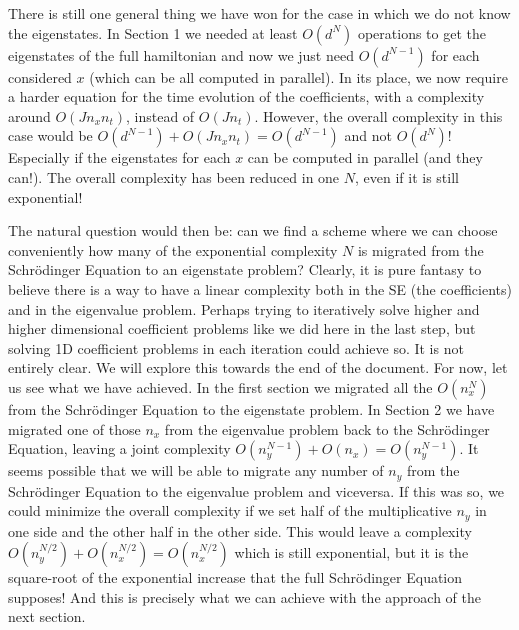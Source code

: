 \documentclass[11pt, a4paper]{article} %
\begin{document}
There is still one general thing we have won for the case in which we do not know the eigenstates. In Section 1 we needed at least $O(d^N)$ operations to get the eigenstates of the full hamiltonian and now we just need $O(d^{N-1})$ for each considered $x$ (which can be all computed in parallel). In its place, we now require a harder equation for the time evolution of the coefficients, with a complexity around $O(Jn_xn_t)$, instead of $O(Jn_t)$. However, the overall complexity in this case would be $O(d^{N-1})+O(Jn_xn_t)=O(d^{N-1})$ and not $O(d^N)$! Especially if the eigenstates for each $x$ can be computed in parallel (and they can!). The overall complexity has been reduced in one $N$, even if it is still exponential!

The natural question would then be: can we find a scheme where we can choose conveniently how many of the exponential complexity $N$ is migrated from the Schrödinger Equation to an eigenstate problem? Clearly, it is pure fantasy to believe there is a way to have a linear complexity both in the SE (the coefficients) and in the eigenvalue problem. Perhaps trying to iteratively solve higher and higher dimensional coefficient problems like we did here in the last step, but solving 1D coefficient problems in each iteration could achieve so. It is not entirely clear. We will explore this towards the end of the document. For now, let us see what we have achieved. In the first section we migrated all the $O(n_x^N)$ from the Schrödinger Equation to the eigenstate problem. In Section 2 we have migrated one of those $n_x$ from the eigenvalue problem back to the Schrödinger Equation, leaving a joint complexity $O(n_y^{N-1})+O(n_x)=O(n_y^{N-1})$. It seems possible that we will be able to migrate any number of $n_y$ from the Schrödinger Equation to the eigenvalue problem and viceversa. If this was so, we could minimize the overall complexity if we set half of the multiplicative $n_y$ in one side and the other half in the other side. This would leave a complexity $O(n_y^{N/2})+O(n_x^{N/2})=O(n_x^{N/2})$ which is still exponential, but it is the square-root of the exponential increase that the full Schrödinger Equation supposes! And this is precisely what we can achieve with the approach of the next section.
\newpage
\end{document}
